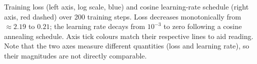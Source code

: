 \caption{Training loss (left axis, log scale, blue) and cosine learning-rate schedule (right axis, red dashed) over 200 training steps. Loss decreases monotonically from $\approx\!2.19$ to $0.21$; the learning rate decays from $10^{-3}$ to zero following a cosine annealing schedule. Axis tick colours match their respective lines to aid reading. Note that the two axes measure different quantities (loss and learning rate), so their magnitudes are not directly comparable.}
